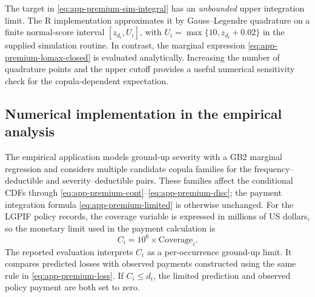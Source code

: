 \documentclass[11pt]{article}
\begin{document}
{The target in \eqref{eq:app-premium-sim-integral} has an \emph{unbounded}
upper integration limit. The R implementation approximates it by
Gauss--Legendre quadrature on a finite normal-score interval
$[z_{d_i},U_i]$, with $U_i=\max\{10,z_{d_i}+0.02\}$ in the supplied
simulation routine. In contrast, the marginal expression
\eqref{eq:app-premium-lomax-closed} is evaluated analytically. Increasing
the number of quadrature points and the upper cutoff provides a useful
numerical sensitivity check for the copula-dependent expectation.

\subsection{Numerical implementation in the empirical analysis}
\label{app:premium-emp}

The empirical application models ground-up severity with a GB2 marginal
regression and considers multiple candidate copula families for the
frequency--deductible and severity--deductible pairs. These families
affect the conditional CDFs through
\eqref{eq:app-premium-cont}--\eqref{eq:app-premium-disc}; the payment
integration formula \eqref{eq:app-premium-limited} is otherwise unchanged.
For the LGPIF policy records, the coverage variable is expressed in
millions of US dollars, so the monetary limit used in the payment
calculation is
\begin{equation}
 C_i=10^{6}\times\mathrm{Coverage}_i.
 \label{eq:app-premium-coverage-units}
\end{equation}
The reported evaluation interprets $C_i$ as a per-occurrence ground-up
limit. It compares predicted losses with observed payments constructed
using the same rule in \eqref{eq:app-premium-loss}. If $C_i\le d_i$, the
limited prediction and observed policy payment are both set to zero.

}
\end{document}
